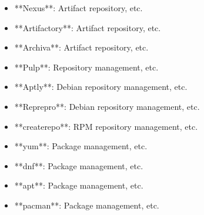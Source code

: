 \documentclass[11pt,a4paper]{article}
\begin{document}
\begin{itemize}
\item **Nexus**: Artifact repository, etc.
\end{itemize}

\begin{itemize}
\item **Artifactory**: Artifact repository, etc.
\end{itemize}

\begin{itemize}
\item **Archiva**: Artifact repository, etc.
\end{itemize}

\begin{itemize}
\item **Pulp**: Repository management, etc.
\end{itemize}

\begin{itemize}
\item **Aptly**: Debian repository management, etc.
\end{itemize}

\begin{itemize}
\item **Reprepro**: Debian repository management, etc.
\end{itemize}

\begin{itemize}
\item **createrepo**: RPM repository management, etc.
\end{itemize}

\begin{itemize}
\item **yum**: Package management, etc.
\end{itemize}

\begin{itemize}
\item **dnf**: Package management, etc.
\end{itemize}

\begin{itemize}
\item **apt**: Package management, etc.
\end{itemize}

\begin{itemize}
\item **pacman**: Package management, etc.
\end{itemize}
\end{document}
